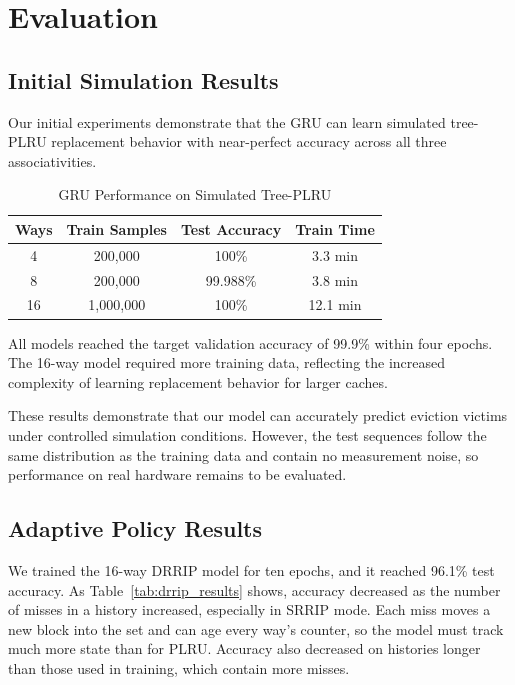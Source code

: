 \section{Evaluation}
\label{sec:evaluation}

\subsection{Initial Simulation Results}

Our initial experiments demonstrate that the GRU can learn
simulated tree-PLRU replacement behavior with near-perfect
accuracy across all three associativities.

\begin{table}[htbp]
\centering
\caption{GRU Performance on Simulated Tree-PLRU}
\label{tab:gru_results}
\begin{tabular}{|c|c|c|c|}
\hline
\textbf{Ways} & \textbf{Train Samples} &
\textbf{Test Accuracy} & \textbf{Train Time} \\
\hline
4  & 200,000   & 100\%    & 3.3 min  \\
8  & 200,000   & 99.988\% & 3.8 min  \\
16 & 1,000,000 & 100\%    & 12.1 min \\
\hline
\end{tabular}
\end{table}

All models reached the target validation accuracy of
99.9\% within four epochs. The 16-way model required
more training data, reflecting the increased complexity
of learning replacement behavior for larger caches.

These results demonstrate that our model can accurately
predict eviction victims under controlled simulation
conditions. However, the test sequences follow the same
distribution as the training data and contain no
measurement noise, so performance on real hardware
remains to be evaluated.

\subsection{Adaptive Policy Results}

We trained the 16-way DRRIP model for ten epochs, and it
reached 96.1\% test accuracy. As
Table~\ref{tab:drrip_results} shows, accuracy decreased as
the number of misses in a history increased, especially in
SRRIP mode. Each miss moves a new block into the set and
can age every way's counter, so the model must track much
more state than for PLRU. Accuracy also decreased on
histories longer than those used in training, which
contain more misses.

